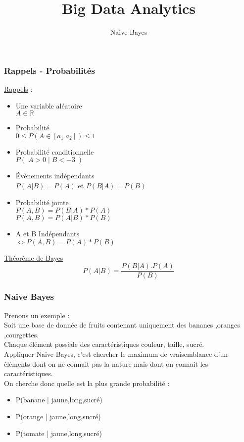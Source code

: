 \documentclass{formation}
\title{Big Data Analytics}
\subtitle{Naive Bayes}
\begin{document}
\maketitle

\begin{frame}
  \frametitle{Rappels - Probabilités}
  \begin{minipage}[c]{0.60\linewidth}
    \underline{Rappels} :
    \begin{itemize}
    \item Une variable aléatoire \\ $A\in\mathbb{R}$
    \item Probabilité \\ $0 \leq P(A\in[a_1\;a_2]) \leq 1$
    \item Probabilité conditionnelle \\ $P(\;A>0\;|\;B<-3\;)$
    \item Évènements indépendants \\ $P(A|B)=P(A)$ et $P(B|A)=P(B)$
    \item Probabilité jointe \\ $P(A,B)=P(B|A)*P(A)$ \\ $P(A,B)=P(A|B)*P(B)$
    \item A et B Indépendants \\ $\iff P(A,B) = P(A)*P(B)$ 
    \end{itemize}
  \end{minipage}\hfill
  \begin{minipage}[c]{0.39\linewidth}
    \begin{center}
      \underline{Théorème de Bayes}
      \[
      \boxed{P(A|B)=\frac{P(B|A).P(A)}{P(B)}}
      \]
    \end{center}
  \end{minipage}\hfill
\end{frame}

\begin{frame}
  \frametitle{Naive Bayes}
  Prenons un exemple : \\
  Soit une base de donnée de fruits contenant uniquement des bananes ,oranges ,courgettes. \\
  Chaque élément possède des caractéristiques couleur, taille, sucré. \\
  Appliquer Naive Bayes, c'est chercher le maximum de vraisemblance d'un élèments dont on ne connait pas la nature mais dont on connait les caractéristiques. \\
  On cherche donc quelle est la plus grande probabilité :
  \begin{itemize}
  \item P(banane | jaune,long,sucré)
  \item P(orange | jaune,long,sucré)
  \item P(tomate | jaune,long,sucré)
  \end{itemize}
\end{frame}
\end{document}
